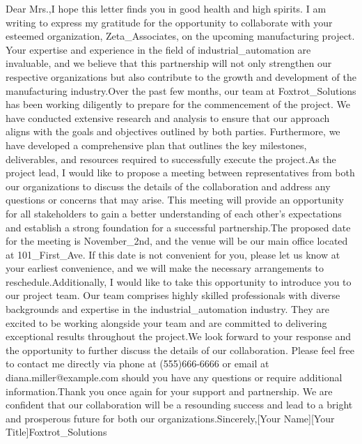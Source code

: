 Dear Mrs.,I hope this letter finds you in good health and high spirits. I am writing to express my gratitude for the opportunity to collaborate with your esteemed organization, Zeta_Associates, on the upcoming manufacturing project. Your expertise and experience in the field of industrial_automation are invaluable, and we believe that this partnership will not only strengthen our respective organizations but also contribute to the growth and development of the manufacturing industry.Over the past few months, our team at Foxtrot_Solutions has been working diligently to prepare for the commencement of the project. We have conducted extensive research and analysis to ensure that our approach aligns with the goals and objectives outlined by both parties. Furthermore, we have developed a comprehensive plan that outlines the key milestones, deliverables, and resources required to successfully execute the project.As the project lead, I would like to propose a meeting between representatives from both our organizations to discuss the details of the collaboration and address any questions or concerns that may arise. This meeting will provide an opportunity for all stakeholders to gain a better understanding of each other's expectations and establish a strong foundation for a successful partnership.The proposed date for the meeting is November_2nd, and the venue will be our main office located at 101_First_Ave. If this date is not convenient for you, please let us know at your earliest convenience, and we will make the necessary arrangements to reschedule.Additionally, I would like to take this opportunity to introduce you to our project team. Our team comprises highly skilled professionals with diverse backgrounds and expertise in the industrial_automation industry. They are excited to be working alongside your team and are committed to delivering exceptional results throughout the project.We look forward to your response and the opportunity to further discuss the details of our collaboration. Please feel free to contact me directly via phone at (555)666-6666 or email at diana.miller@example.com should you have any questions or require additional information.Thank you once again for your support and partnership. We are confident that our collaboration will be a resounding success and lead to a bright and prosperous future for both our organizations.Sincerely,[Your Name][Your Title]Foxtrot_Solutions